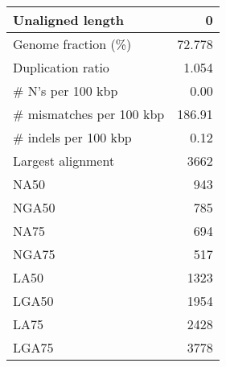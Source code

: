 \documentclass[12pt,a4paper]{article}
\begin{document}
\begin{table}[ht]
\begin{center}
\begin{tabular}{|l*{1}{|r}|}
Unaligned length & 0 \\ \hline
Genome fraction (\%) & 72.778 \\ \hline
Duplication ratio & 1.054 \\ \hline
\# N's per 100 kbp & 0.00 \\ \hline
\# mismatches per 100 kbp & 186.91 \\ \hline
\# indels per 100 kbp & 0.12 \\ \hline
Largest alignment & 3662 \\ \hline
NA50 & 943 \\ \hline
NGA50 & 785 \\ \hline
NA75 & 694 \\ \hline
NGA75 & 517 \\ \hline
LA50 & 1323 \\ \hline
LGA50 & 1954 \\ \hline
LA75 & 2428 \\ \hline
LGA75 & 3778 \\ \hline
\end{tabular}
\end{center}
\end{table}
\end{document}
